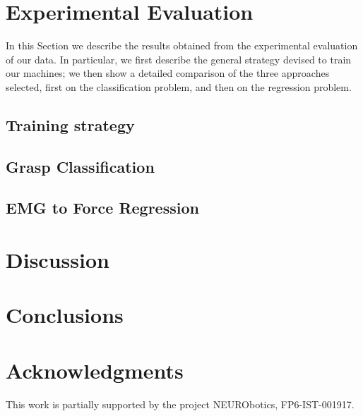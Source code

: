 \documentclass[journal]{IEEEtran}
\begin{document}
\section{Experimental Evaluation}
\label{sec:exp}

In this Section we describe the results obtained from the experimental
evaluation of our data. In particular, we first describe the general
strategy devised to train our machines; we then show a detailed
comparison of the three approaches selected, first on the
classification problem, and then on the regression problem.

\subsection{Training strategy}
\label{subsec:strategy}


\subsection{Grasp Classification}
\label{subsec:classification}


\subsection{EMG to Force Regression}
\label{subsec:regression}


\section{Discussion}
\label{sec:discussion}


\section{Conclusions}
\label{sec:conclusions}



\section*{Acknowledgments}

This work is partially supported by the project NEURObotics,
FP6-IST-001917.

{\small


}



\end{document}
